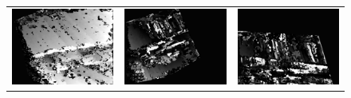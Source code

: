 \documentclass[11pt]{report}
\begin{document}
\begin{figure}[H]
\begin{tabular}{ccc}
    \includegraphics[scale=0.1]{images/disparity-opencv-t/disparity_1.png} &
    \includegraphics[scale=0.1]{images/disparity-opencv-d/disparity_1.png} &
    \includegraphics[scale=0.1]{images/disparity-opengv/disparity_1.png} \\

\end{tabular}
\end{figure}
\end{document}

